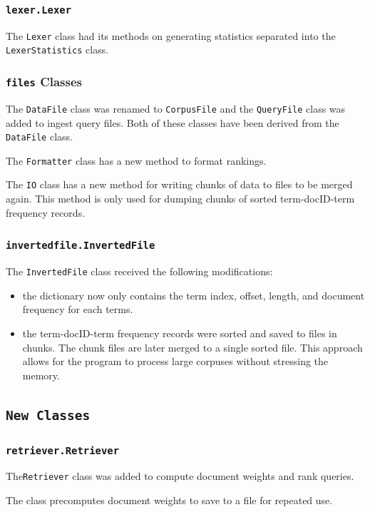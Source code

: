 \documentclass[11pt]{article}
\begin{document}
\subsubsection{\texttt{lexer.Lexer}}
The \texttt{Lexer} class had its methods on generating statistics separated into the \texttt{LexerStatistics} class.

\subsubsection{\texttt{files} Classes}
The \texttt{DataFile} class was renamed to \texttt{CorpusFile} and the \texttt{QueryFile} class was added to ingest query files. Both of these classes have been derived from the \texttt{DataFile} class.

The \texttt{Formatter} class has a new method to format rankings.

The \texttt{IO} class has a new method for writing chunks of data to files to be merged again. This method is only used for dumping chunks of sorted term-docID-term frequency records.

\subsubsection{\texttt{invertedfile.InvertedFile}}
The \texttt{InvertedFile} class received the following modifications:
\begin{itemize}
    \item the dictionary now only contains the term index, offset, length, and document frequency for each terms.
    \item the term-docID-term frequency records were sorted and saved to files in chunks. The chunk files are later merged to a single sorted file. This approach allows for the program to process  large corpuses without stressing the memory.
\end{itemize}

\subsection{\texttt{New Classes}}

\subsubsection{\texttt{retriever.Retriever}}
The\texttt{Retriever} class was added to compute document weights and rank queries.

The class precomputes document weights to save to a file for repeated use.
\end{document}
